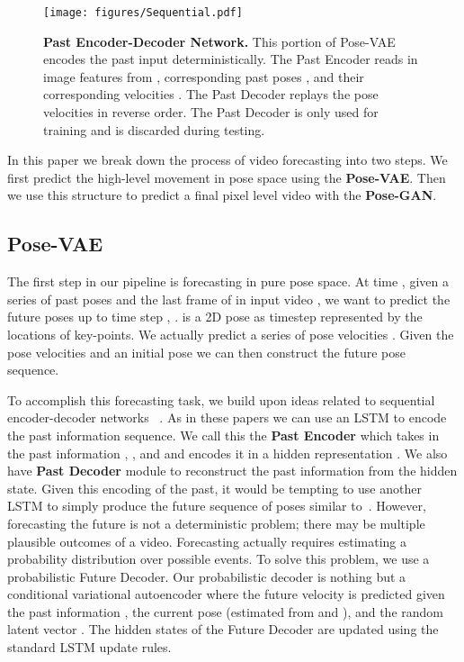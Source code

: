 \begin{figure}
\centering
\texttt{[image: figures/Sequential.pdf]} 
\caption{{\bf Past Encoder-Decoder Network.} This portion of Pose-VAE encodes the past input deterministically. The Past Encoder reads in image features from , corresponding past poses , and their corresponding velocities . The Past Decoder replays the pose velocities in reverse order. The Past Decoder is only used for training and is discarded during testing. }
\label{fig:SequentialPast}
\end{figure}

In this paper we break down the process of video forecasting into two steps. We first predict the high-level movement in pose space using the \textbf{Pose-VAE}.
Then we use this structure to predict a final pixel level video with the \textbf{Pose-GAN}. 

\subsection{Pose-VAE}
The first step in our pipeline is forecasting in pure pose space. At time , given a series of past poses  and the last frame of in input video , we want to predict the future poses up to time step , .  is a 2D pose as timestep  represented by the  locations of  key-points. We actually predict a series of pose velocities .
Given the pose velocities and an initial pose we can then construct the future pose sequence.





To accomplish this forecasting task, we build upon ideas related to sequential encoder-decoder networks ~\cite{Srivastava15, Fragikiadaki15}. As in these papers we can use an LSTM to encode the past information sequence. We call this the \textbf{Past Encoder} which takes in the past information , , and  and encodes it in a hidden representation . We also have \textbf{Past Decoder} module to reconstruct the past information from the hidden state. Given this encoding  of the past, it would be tempting to use another LSTM to simply produce the future sequence of poses similar to~\cite{Srivastava15}. However, forecasting the future is not a deterministic problem; there may be multiple plausible outcomes of a video. Forecasting actually requires estimating a probability distribution over possible events. To solve this problem, we use a probabilistic Future Decoder. Our probabilistic decoder is nothing but a conditional variational autoencoder where the future velocity  is predicted given the past information , the current pose  (estimated from  and ), and the random latent vector . The hidden states of the Future Decoder are updated using the standard LSTM update rules.

